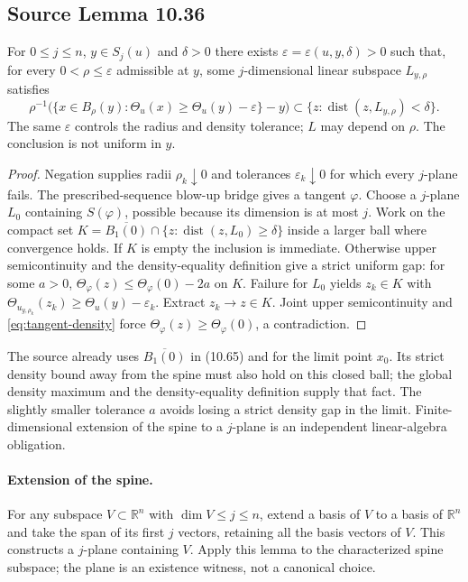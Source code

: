 \documentclass[11pt,a4paper]{article}
\numberwithin{equation}{section}
\theoremstyle{definition}
\theoremstyle{remark}
\newcommand{\R}{\mathbb R}
\newcommand{\Th}{\Theta}
\newcommand{\dist}{\operatorname{dist}}
\begin{document}
\subsection{Source Lemma 10.36}\label{lem:concentration}
For $0\le j\le n$, $y\in S_j(u)$ and $\delta>0$ there exists
$\varepsilon=\varepsilon(u,y,\delta)>0$ such that, for every
$0<\rho\le\varepsilon$ admissible at $y$, some $j$-dimensional linear
subspace $L_{y,\rho}$ satisfies
\begin{equation}\label{eq:concentration}
 \rho^{-1}\bigl(\{x\in B_\rho(y):
   \Th_u(x)\ge\Th_u(y)-\varepsilon\}-y\bigr)
 \subset\{z:\dist(z,L_{y,\rho})<\delta\}.
\end{equation}
The same $\varepsilon$ controls the radius and density tolerance; $L$
may depend on $\rho$. The conclusion is not uniform in $y$.

\begin{proof}
Negation supplies radii $\rho_k\downarrow0$ and tolerances
$\varepsilon_k\downarrow0$ for which every $j$-plane fails. The
prescribed-sequence blow-up bridge gives a tangent $\varphi$. Choose a
$j$-plane $L_0$ containing $S(\varphi)$, possible because its dimension
is at most $j$. Work on the compact set
$K=\overline{B_1(0)}\cap\{z:\dist(z,L_0)\ge\delta\}$ inside a larger
ball where convergence holds. If $K$ is empty the inclusion is immediate.
Otherwise upper semicontinuity and the density-equality definition give
a strict uniform gap: for some $a>0$,
$\Th_\varphi(z)\le\Th_\varphi(0)-2a$ on $K$.
Failure for $L_0$ yields $z_k\in K$ with
$\Th_{u_{y,\rho_k}}(z_k)\ge\Th_u(y)-\varepsilon_k$.
Extract $z_k\to z\in K$. Joint upper semicontinuity and
\eqref{eq:tangent-density} force
$\Th_\varphi(z)\ge\Th_\varphi(0)$, a contradiction.
\end{proof}
The source already uses $\overline{B_1(0)}$ in (10.65) and for the limit
point $x_0$. Its strict density bound away from the spine must also hold
on this closed ball; the global density maximum and the density-equality
definition supply that fact. The slightly smaller tolerance $a$ avoids
losing a strict density gap in the limit. Finite-dimensional extension of
the spine to a $j$-plane is an independent linear-algebra obligation.

\paragraph{Extension of the spine.}\label{step:spine-plane}
For any subspace $V\subset\R^n$ with $\dim V\le j\le n$, extend a basis
of $V$ to a basis of $\R^n$ and take the span of its first $j$ vectors,
retaining all the basis vectors of $V$. This constructs a $j$-plane
containing $V$. Apply this lemma to the characterized spine subspace;
the plane is an existence witness, not a canonical choice.
\end{document}
